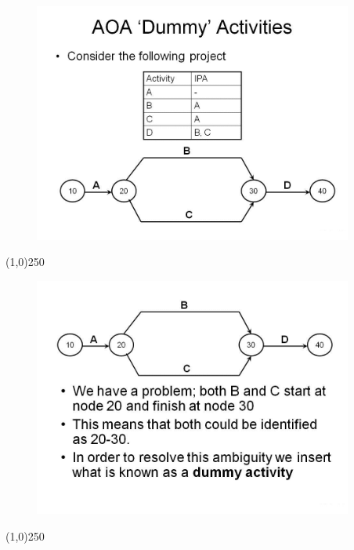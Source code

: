 \begin{frame}
\begin{figure}
	\centering
		\includegraphics[width = 10.5cm]{oldnotes/Slide50.jpg}
\end{figure}
\end{frame}
\begin{center}\line(1,0){250}\end{center}





\begin{frame}
\begin{figure}
	\centering
		\includegraphics[width = 10.5cm]{oldnotes/Slide51.jpg}
\end{figure}
\end{frame}
\begin{center}\line(1,0){250}\end{center}





